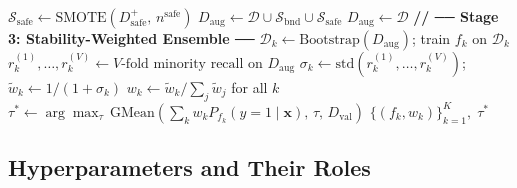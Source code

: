 \documentclass[11pt,a4paper]{article}
\newcommand{\Dsafe}{D^{+}_{\mathrm{safe}}}
\newcommand{\Daug}{D_{\mathrm{aug}}}
\newcommand{\Dval}{D_{\mathrm{val}}}
\begin{document}
\begin{algorithm}[H]
\begin{algorithmic}[1]
    \EndIf
  \EndFor
  \State $\mathcal{S}_{\mathrm{safe}} \leftarrow \text{SMOTE}(\Dsafe,\,n^{\mathrm{safe}})$
  \State $\Daug \leftarrow \mathcal{D} \cup \mathcal{S}_{\mathrm{bnd}} \cup \mathcal{S}_{\mathrm{safe}}$
\Else
  \State $\Daug \leftarrow \mathcal{D}$
\EndIf
\State \textbf{// ── Stage 3: Stability-Weighted Ensemble ──}
  \State $\mathcal{D}_k \leftarrow \text{Bootstrap}(\Daug)$;\; train $f_k$ on $\mathcal{D}_k$
  \State $r_k^{(1)}, \ldots, r_k^{(V)} \leftarrow V\text{-fold minority recall on } \Daug$
  \State $\sigma_k \leftarrow \mathrm{std}(r_k^{(1)}, \ldots, r_k^{(V)})$;\;
         $\tilde{w}_k \leftarrow 1/(1+\sigma_k)$
\EndFor
\State $w_k \leftarrow \tilde{w}_k / \sum_j \tilde{w}_j$ for all $k$
\State $\tau^* \leftarrow \arg\max_\tau\,\mathrm{GMean}(\sum_k w_k P_{f_k}(y=1\mid\mathbf{x}),\,\tau,\,\Dval)$
\State \Return $\{(f_k, w_k)\}_{k=1}^K,\;\tau^*$
\end{algorithmic}
\end{algorithm}

\subsection{Hyperparameters and Their Roles}
\end{document}
